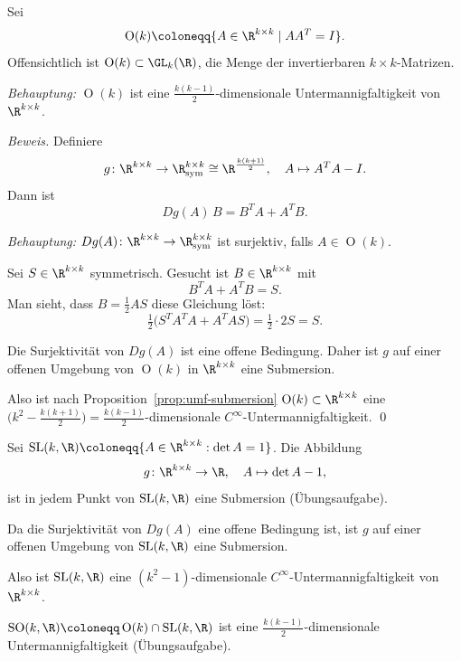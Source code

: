 \documentclass[11pt]{article}
\begin{document}
\begin{example}
  Sei
  \[ \operatorname{O}(k) \coloneqq \{ A \in \R^{k \times k} \mid A A^T = I \}. \]
  Offensichtlich ist $\operatorname{O}(k) \subset \GL_k(\R)$, die Menge der invertierbaren $k \times k$-Matrizen.

  \textit{Behauptung:} $\operatorname{O}(k)$ ist eine $\frac{k(k-1)}{2}$-dimensionale Untermannigfaltigkeit von $\R^{k \times k}$.

  \textit{Beweis.} Definiere
  \[ g\colon \R^{k \times k} \to \R^{k \times k}_{\mathrm{sym}} \cong \R^{\frac{k(k+1)}{2}}, \quad A \mapsto A^T A - I. \]
  Dann ist
  \[ Dg(A)\, B = B^T A + A^T B. \]

  \textit{Behauptung:} $Dg(A)\colon \R^{k \times k} \to \R^{k \times k}_{\mathrm{sym}}$ ist surjektiv, falls $A \in \operatorname{O}(k)$.

  Sei $S \in \R^{k \times k}$ symmetrisch. Gesucht ist $B \in \R^{k \times k}$ mit
  \[ B^T A + A^T B = S. \]
Man sieht, dass $B = \frac{1}{2} A S$ diese Gleichung löst:
  \[ \tfrac{1}{2} \bigl(S^T A^T A + A^T A S\bigr) = \tfrac{1}{2} \cdot 2 S = S. \]
\begin{ergaenzung}
  Die Surjektivität von $Dg(A)$ ist eine offene Bedingung. Daher ist $g$ auf einer offenen Umgebung von $\operatorname{O}(k)$ in $\R^{k \times k}$ eine Submersion.
  \end{ergaenzung}
  Also ist nach Proposition~\ref{prop:umf-submersion} $\operatorname{O}(k) \subset \R^{k \times k}$ eine $\bigl(k^2 - \frac{k(k+1)}{2}\bigr) = \frac{k(k-1)}{2}$-dimensionale $C^\infty$-Untermannigfaltigkeit. \qed
\end{example}

\begin{example}
  Sei $\operatorname{SL}(k, \R) \coloneqq \{ A \in \R^{k \times k} : \det A = 1 \}$. Die Abbildung
  \[ g\colon \R^{k \times k} \to \R, \quad A \mapsto \det A - 1, \]
  ist in jedem Punkt von $\operatorname{SL}(k, \R)$ eine Submersion (Übungsaufgabe).
\begin{ergaenzung}
  Da die Surjektivität von $Dg(A)$ eine offene Bedingung ist, ist $g$ auf einer offenen Umgebung von $\operatorname{SL}(k, \R)$ eine Submersion.
  \end{ergaenzung}
  Also ist $\operatorname{SL}(k, \R)$ eine $(k^2 - 1)$-dimensionale $C^\infty$-Untermannigfaltigkeit von $\R^{k \times k}$.
\end{example}

\begin{example}
  $\operatorname{SO}(k, \R) \coloneqq \operatorname{O}(k) \cap \operatorname{SL}(k, \R)$ ist eine $\frac{k(k-1)}{2}$-dimensionale Untermannigfaltigkeit (Übungsaufgabe).
\end{example}
\end{document}
